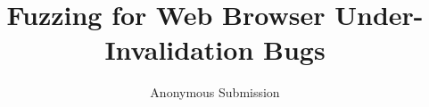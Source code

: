 \documentclass[12pt]{article}
\begin{document}
\title{Fuzzing for Web Browser Under-Invalidation Bugs}
\author{Anonymous Submission}
\date{}

\maketitle
\thispagestyle{fancy}












\end{document}
